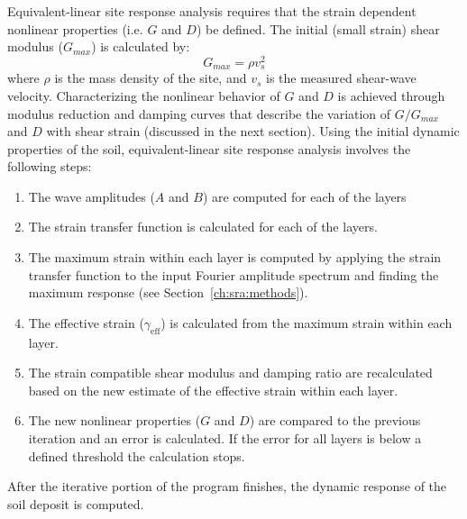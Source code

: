 \documentclass[12pt,oneside]{book}
\begin{document}
Equivalent-linear site response analysis requires that the strain dependent nonlinear properties
(i.e. $G$ and $D$) be defined.  The initial (small strain) shear modulus ($G_{max}$) is calculated by:
\begin{equation}
    G_{max} = \rho v_s ^ 2
\end{equation}
where $\rho$ is the mass density of the site, and $v_s$ is the measured shear-wave velocity.
Characterizing the nonlinear behavior of $G$ and $D$ is achieved through modulus reduction and
damping curves that describe the variation of $G/G_{max}$ and $D$ with shear strain (discussed in
the next section).  Using the initial dynamic properties of the soil, equivalent-linear site
response analysis involves the following steps:
\begin{enumerate}
    \item The wave amplitudes ($A$ and $B$) are computed for each of the layers
    \item The strain transfer function is calculated for each of the layers.
    \item The maximum strain within each layer is computed by applying the strain transfer function
        to the input Fourier amplitude spectrum and finding the maximum response (see
        Section~\ref{ch:sra:methods}).
    \item The effective strain ($\gamma_{\mathrm{eff}}$) is calculated from the maximum strain within
        each layer.
    \item The strain compatible shear modulus and damping ratio are recalculated based on the new
        estimate of the effective strain within each layer.
    \item The new nonlinear properties ($G$ and $D$) are compared to the previous iteration and an
        error is calculated.  If the error for all layers is below a defined threshold the calculation
        stops.
\end{enumerate}
After the iterative portion of the program finishes, the dynamic response of the soil deposit is
computed.  


\end{document}
